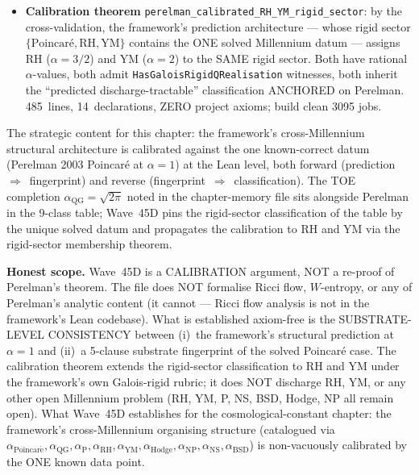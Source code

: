 \begin{remark}
\begin{itemize}
  \item \textbf{Calibration theorem} \texttt{perelman\_calibrated\_RH\_YM\_rigid\_sector}: by the cross-validation, the framework's prediction architecture --- whose rigid sector $\{\text{Poincar\'e}, \mathrm{RH}, \mathrm{YM}\}$ contains the ONE solved Millennium datum --- assigns RH ($\alpha = 3/2$) and YM ($\alpha = 2$) to the SAME rigid sector. Both have rational $\alpha$-values, both admit \texttt{HasGaloisRigidQRealisation} witnesses, both inherit the ``predicted discharge-tractable'' classification ANCHORED on Perelman. 485~lines, 14~declarations, ZERO project axioms; build clean 3095 jobs.
\end{itemize}
The strategic content for this chapter: the framework's cross-Millennium structural architecture is calibrated against the one known-correct datum (Perelman 2003 Poincar\'e at $\alpha = 1$) at the Lean level, both forward (prediction~$\Rightarrow$~fingerprint) and reverse (fingerprint~$\Rightarrow$~classification). The TOE completion $\alpha_{\mathrm{QG}} = \sqrt{2\pi}$ noted in the chapter-memory file sits alongside Perelman in the 9-class table; Wave~45D pins the rigid-sector classification of the table by the unique solved datum and propagates the calibration to RH and YM via the rigid-sector membership theorem.

\textbf{Honest scope.} Wave~45D is a CALIBRATION argument, NOT a re-proof of Perelman's theorem. The file does NOT formalise Ricci flow, $W$-entropy, or any of Perelman's analytic content (it cannot --- Ricci flow analysis is not in the framework's Lean codebase). What is established axiom-free is the SUBSTRATE-LEVEL CONSISTENCY between (i)~the framework's structural prediction at $\alpha = 1$ and (ii)~a 5-clause substrate fingerprint of the solved Poincar\'e case. The calibration theorem extends the rigid-sector classification to RH and YM under the framework's own Galois-rigid rubric; it does NOT discharge RH, YM, or any other open Millennium problem (RH, YM, P, NS, BSD, Hodge, NP all remain open). What Wave~45D establishes for the cosmological-constant chapter: the framework's cross-Millennium organising structure (catalogued via $\alpha_{\mathrm{Poincar\acute{e}}}, \alpha_{\mathrm{QG}}, \alpha_{\mathrm{P}}, \alpha_{\mathrm{RH}}, \alpha_{\mathrm{YM}}, \alpha_{\mathrm{Hodge}}, \alpha_{\mathrm{NP}}, \alpha_{\mathrm{NS}}, \alpha_{\mathrm{BSD}}$) is non-vacuously calibrated by the ONE known data point.
\end{remark}

